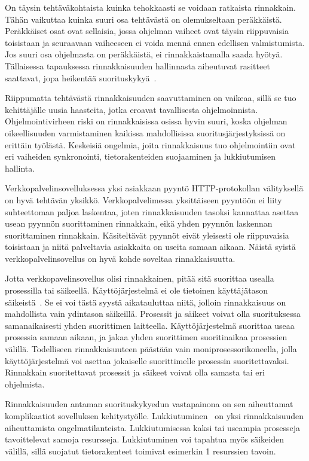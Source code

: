 \documentclass[finnish]{tktltiki2}
\theoremstyle{definition}
\theoremstyle{remark}
\begin{document}
On täysin tehtäväkohtaista kuinka tehokkaasti se voidaan ratkaista rinnakkain.
Tähän vaikuttaa kuinka suuri osa tehtävästä on olemukseltaan peräkkäistä.
Peräkkäiset osat ovat sellaisia, jossa ohjelman vaiheet ovat täysin
riippuvaisia toisistaan ja seuraavaan vaiheeseen ei voida mennä ennen edellisen
valmistumista. Jos suuri osa ohjelmasta on peräkkäistä, ei rinnakkaistamalla
saada hyötyä. Tällaisessa tapauksessa rinnakkaisuuden hallinnasta aiheutuvat
rasitteet saattavat, jopa heikentää suorituskykyä~\cite{stallings_operating_2018}.

Riippumatta tehtävästä rinnakkaisuuden saavuttaminen on vaikeaa,
sillä se tuo kehittäjälle uusia haasteita, jotka eroavat tavallisesta
ohjelmoinnista. Ohjelmointivirheen riski on rinnakkaisissa osissa hyvin suuri,
koska ohjelman oikeellisuuden varmistaminen kaikissa mahdollisissa
suoritusjärjestyksissä on erittäin työlästä.
Keskeisiä ongelmia, joita rinnakkaisuus tuo ohjelmointiin ovat eri vaiheiden
synkronointi, tietorakenteiden suojaaminen ja lukkiutumisen hallinta.

Verkkopalvelinsovelluksessa yksi asiakkaan pyyntö HTTP-protokollan välityksellä
on hyvä tehtävän yksikkö. Verkkopalvelimessa yksittäiseen
pyyntöön ei liity suhteettoman paljoa laskentaa, joten
rinnakkaisuuden tasoksi kannattaa asettaa usean pyynnön
suorittaminen rinnakkain, eikä yhden pyynnön laskennan
suorittaminen rinnakkain.
Käsiteltävät pyynnöt eivät yleisesti ole riippuvaisia
toisistaan ja niitä palveltavia asiakkaita on useita
samaan aikaan.
Näistä syistä verkkopalvelinsovellus on hyvä kohde soveltaa rinnakkaisuutta.

Jotta verkkopavelinsovellus olisi rinnakkainen, pitää sitä
suorittaa usealla prosessilla tai säikeellä.
Käyttöjärjestelmä ei ole tietoinen käyttäjätason säikeistä~\cite{stallings_operating_2018}.
Se ei voi tästä syystä aikatauluttaa niitä,
jolloin rinnakkaisuus on mahdollista
vain ydintason säikeillä.
Prosessit ja säikeet voivat olla suorituksessa samanaikaisesti
yhden suorittimen laitteella. Käyttöjärjestelmä suorittaa useaa prosessia
samaan aikaan, ja jakaa yhden suorittimen suoritinaikaa prosessien välillä.
Todelliseen rinnakkaisuuteen päästään vain moniprosessorikoneella, jolla
käyttöjärjestelmä voi asettaa jokaiselle suorittimelle prosessin suoritettavaksi.
Rinnakkain suoritettavat prosessit ja säikeet voivat olla samasta tai
eri ohjelmista.

Rinnakkaisuuden antaman suorituskykyedun vastapainona
on sen aiheuttamat komplikaatiot sovelluksen kehitystyölle.
Lukkiutuminen~\cite{stallings_operating_2018}
on yksi rinnakkaisuuden aiheuttamista ongelmatilanteista.
Lukkiutumisessa kaksi tai useampia prosesseja tavoittelevat samoja resursseja.
Lukkiutuminen voi tapahtua myös säikeiden välillä, sillä
suojatut tietorakenteet toimivat esimerkin 1 resurssien tavoin.
\end{document}
